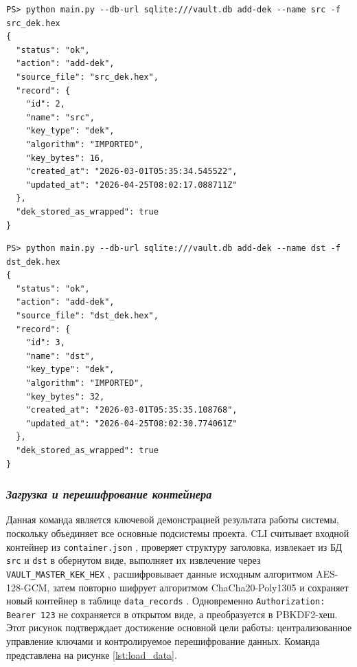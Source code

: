 \documentclass[14pt, a4paper]{extarticle}
\renewcommand{\texttt}[1]{%
  {\def\UrlFont{\ttfamily}\nolinkurl{#1}}%
}
\begin{document}
\needspace{1.5cm}

\begin{lstlisting}[style=bashcommand, caption={Создание src DEK}, label=lst:load_src_dek]
PS> python main.py --db-url sqlite:///vault.db add-dek --name src -f src_dek.hex
{
  "status": "ok",
  "action": "add-dek",
  "source_file": "src_dek.hex",
  "record": {
    "id": 2,
    "name": "src",
    "key_type": "dek",
    "algorithm": "IMPORTED",
    "key_bytes": 16,
    "created_at": "2026-03-01T05:35:34.545522",
    "updated_at": "2026-04-25T08:02:17.088711Z"
  },
  "dek_stored_as_wrapped": true
}
\end{lstlisting}

\begin{lstlisting}[style=bashcommand, caption={Создание dst DEK}, label=lst:load_dst_dek]
PS> python main.py --db-url sqlite:///vault.db add-dek --name dst -f dst_dek.hex
{
  "status": "ok",
  "action": "add-dek",
  "source_file": "dst_dek.hex",
  "record": {
    "id": 3,
    "name": "dst",
    "key_type": "dek",
    "algorithm": "IMPORTED",
    "key_bytes": 32,
    "created_at": "2026-03-01T05:35:35.108768",
    "updated_at": "2026-04-25T08:02:30.774061Z"
  },
  "dek_stored_as_wrapped": true
}
\end{lstlisting}

\subsubsection*{\textit{Загрузка и перешифрование контейнера}}

Данная команда является ключевой демонстрацией результата работы системы, поскольку объединяет все основные подсистемы проекта. CLI считывает входной контейнер из \texttt{container.json}, проверяет структуру заголовка, извлекает из БД \texttt{src} и \texttt{dst} в обернутом виде, выполняет их извлечение через \texttt{VAULT\_MASTER\_KEK\_HEX}, расшифровывает данные исходным алгоритмом AES-128-GCM, затем повторно шифрует алгоритмом ChaCha20-Poly1305 и сохраняет новый контейнер в таблице \texttt{data\_records}. Одновременно \texttt{Authorization: Bearer 123} не сохраняется в открытом виде, а преобразуется в PBKDF2-хеш. Этот рисунок подтверждает достижение основной цели работы: централизованное управление ключами и контролируемое перешифрование данных. Команда представлена на рисунке \ref{lst:load_data}.
\end{document}

